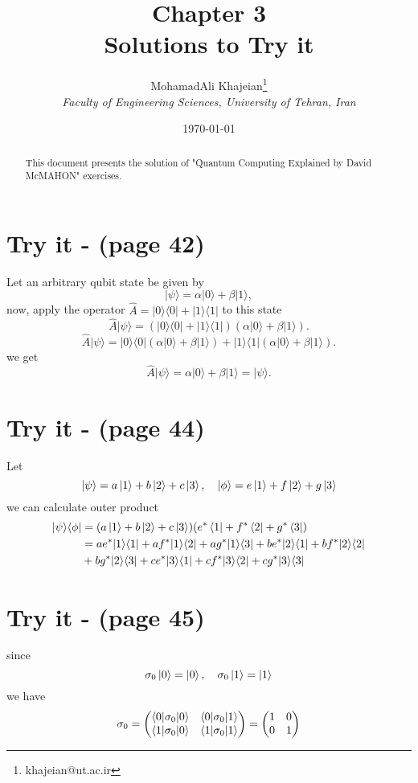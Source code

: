 \documentclass[12pt]{article}
\title{\textbf{Chapter 3} \\ \small Solutions to Try it}
\author{
    MohamadAli Khajeian\footnote{khajeian@ut.ac.ir} \\ 
    \small \textit{Faculty of Engineering Sciences, University of Tehran, Iran} \\ 
}
\date{\today}
\begin{document}
\maketitle

\begin{abstract}
    This document presents the solution of "Quantum Computing Explained by David McMAHON" exercises.
\end{abstract}

\section*{Try it - (page 42)}
Let an arbitrary qubit state be given by
\[
|\psi\rangle = \alpha |0\rangle + \beta |1\rangle,
\]
now, apply the operator \(\hat{A} = |0\rangle\langle 0| + |1\rangle\langle 1|\) to this state
\[
\hat{A} |\psi\rangle = (|0\rangle\langle 0| + |1\rangle\langle 1|)(\alpha |0\rangle + \beta |1\rangle).
\]
\[
\hat{A} |\psi\rangle = |0\rangle\langle 0|(\alpha |0\rangle + \beta |1\rangle) + |1\rangle\langle 1|(\alpha |0\rangle + \beta |1\rangle).
\]
we get
\[
\hat{A} |\psi\rangle = \alpha |0\rangle + \beta |1\rangle = |\psi\rangle.
\]

\section*{Try it - (page 44)}
Let
\begin{equation*}
    \ket{\psi} = a\ket{1} + b\ket{2} + c\ket{3}, \quad \ket{\phi} = e\ket{1} + f\ket{2} + g\ket{3}
\end{equation*}
we can calculate outer product
\begin{align*}
    |\psi\rangle \langle\phi| &= (a\ket{1} + b\ket{2} + c\ket{3})(e^*\bra{1} + f^*\bra{2} + g^*\bra{3}) \\
    &= ae^{*}|1\rangle \langle1| + af^{*}|1\rangle \langle2| + ag^{*}|1\rangle \langle3| + be^{*}|2\rangle \langle1| + bf^{*}|2\rangle \langle2| \\
    &+ bg^{*}|2\rangle \langle3| + ce^{*}|3\rangle \langle1| + cf^{*}|3\rangle \langle2| + cg^{*}|3\rangle \langle3|
\end{align*}

\section*{Try it - (page 45)}
since 
\begin{equation*}
    \sigma_{0}\ket{0} = \ket{0}, \quad \sigma_{0}\ket{1} = \ket{1}  
\end{equation*}
we have
\begin{equation*}
    \sigma_{0} = \begin{pmatrix} \braket{0|\sigma_{0}|0} & \braket{0|\sigma_{0}|1} \\ \braket{1|\sigma_{0}|0} & \braket{1|\sigma_{0}|1} \end{pmatrix}
    = \begin{pmatrix} 1 & 0 \\ 0 & 1 \end{pmatrix}
\end{equation*}
\end{document}
